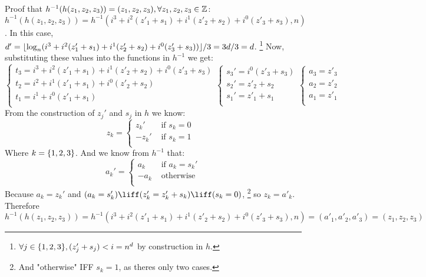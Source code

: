         \newpage
        Proof that $h^{-1}(h(z_1,z_2,z_3)) = (z_1,z_2,z_3), \forall z_1,z_2,z_3 \in \mathbb{Z}$:\\ 
        $h^{-1}(h(z_1,z_2,z_3)) = h^{-1}(
            i^3 + i^2 (z'_1 + s_1) + i^1 (z'_2 + s_2) + i^0 (z'_3 + s_3)
            , n)
            $.
        In this case, $d' = \lfloor \log_n(i^3 + i^2 (z'_1 + s_1) + i^1 (z'_2 + s_2) + i^0 (z'_3 + s_3)) \rfloor / 3
            = 3d / 3 = d$.
        \footnote{$\forall j \in \{ 1,2,3 \}, (z'_j + s_j) < i = n^d$ by construction in $h$.}
        Now, substituting these values into the functions in $h^{-1}$ we get:
        \[
            \begin{cases}
                t_3 = i^3 + i^2 (z'_1 + s_1) + i^1 (z'_2 + s_2) + i^0 (z'_3 + s_3) \\ 
                t_2 = i^2 + i^1 (z'_1 + s_1) + i^0 (z'_2 + s_2)  \\ 
                t_1 = i^1 + i^0 (z'_1 + s_1) \\ 
            \end{cases}
            \begin{cases}
                s_3' = i^0 (z'_3 + s_3) \\ 
                s_2' = z'_2 + s_2 \\ 
                s_1' = z'_1 + s_1 \\ 
            \end{cases}
            \begin{cases}
                a_3 = z'_3 \\ 
                a_2 = z'_2 \\ 
                a_1 = z'_1 \\ 
            \end{cases}
        \]
        From the construction of $z_j'$ and $s_j$ in $h$ we know: 
        \[
            z_{k} = 
            \begin{cases}
                z_{k}' & \text{ if $s_k = 0$ }\\ 
                -z_{k}' & \text{ if $s_k = 1$} \\ 
            \end{cases}
        \]
        Where $k = \{ 1,2,3 \}$.
        And we know from $h^{-1}$ that:
        \[
            a_k' = 
            \begin{cases}
                a_k & \text{ if $a_k = s_k'$} \\ 
                -a_k & \text{ otherwise} \\ 
            \end{cases}
        \]
        Because $a_k = z_k'$ and $(a_k = s_k') \liff (z'_k = z'_k + s_k) \liff (s_k = 0)$,
        \footnote{And "otherwise" IFF $s_k = 1$, as theres only two cases.}
        so $z_k = a'_k$.
        Therefore \(
            h^{-1}(h(z_1,z_2,z_3)) 
            = h^{-1}(
                i^3 + i^2 (z'_1 + s_1) + i^1 (z'_2 + s_2) + i^0 (z'_3 + s_3)
                , n)
            = (a'_1, a'_2, a'_3)
            = (z_1,z_2,z_3)
        \)
        
